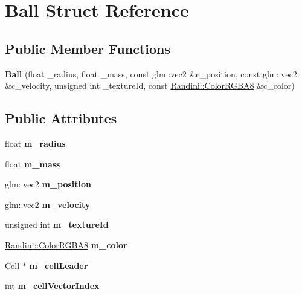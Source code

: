 \hypertarget{structBall}{
\section{Ball Struct Reference}
\label{structBall}
}
\subsection*{Public Member Functions}
\begin{DoxyCompactItemize}
\item 
\hypertarget{structBall_a39a1cb33a6f2e3a4c692144967c3f4ef}{
{\bfseries Ball} (float \_\-radius, float \_\-mass, const glm::vec2 \&c\_\-position, const glm::vec2 \&c\_\-velocity, unsigned int \_\-textureId, const \hyperlink{structRandini_1_1ColorRGBA8}{Randini::ColorRGBA8} \&c\_\-color)}
\label{structBall_a39a1cb33a6f2e3a4c692144967c3f4ef}

\end{DoxyCompactItemize}
\subsection*{Public Attributes}
\begin{DoxyCompactItemize}
\item 
\hypertarget{structBall_a3bc6acf9f3013d514e9a74c06a81f0cc}{
float {\bfseries m\_\-radius}}
\label{structBall_a3bc6acf9f3013d514e9a74c06a81f0cc}

\item 
\hypertarget{structBall_a22c5fc77318cc724a5e7aad38df1ce85}{
float {\bfseries m\_\-mass}}
\label{structBall_a22c5fc77318cc724a5e7aad38df1ce85}

\item 
\hypertarget{structBall_a5daf4402dc74b3da7806549c120344bd}{
glm::vec2 {\bfseries m\_\-position}}
\label{structBall_a5daf4402dc74b3da7806549c120344bd}

\item 
\hypertarget{structBall_a9537fb69d4b0e4370e3aba2f6b894579}{
glm::vec2 {\bfseries m\_\-velocity}}
\label{structBall_a9537fb69d4b0e4370e3aba2f6b894579}

\item 
\hypertarget{structBall_a9abd8e7caf65e1e6b96cbc101eb95ac5}{
unsigned int {\bfseries m\_\-textureId}}
\label{structBall_a9abd8e7caf65e1e6b96cbc101eb95ac5}

\item 
\hypertarget{structBall_aa8b1fa3be1200bb682524c230e424542}{
\hyperlink{structRandini_1_1ColorRGBA8}{Randini::ColorRGBA8} {\bfseries m\_\-color}}
\label{structBall_aa8b1fa3be1200bb682524c230e424542}

\item 
\hypertarget{structBall_aa56d84ee36d426c37108b3cd55e548a5}{
\hyperlink{structCell}{Cell} $\ast$ {\bfseries m\_\-cellLeader}}
\label{structBall_aa56d84ee36d426c37108b3cd55e548a5}

\item 
\hypertarget{structBall_a80db4312481afac22d0f00487a3e759f}{
int {\bfseries m\_\-cellVectorIndex}}
\label{structBall_a80db4312481afac22d0f00487a3e759f}

\end{DoxyCompactItemize}


